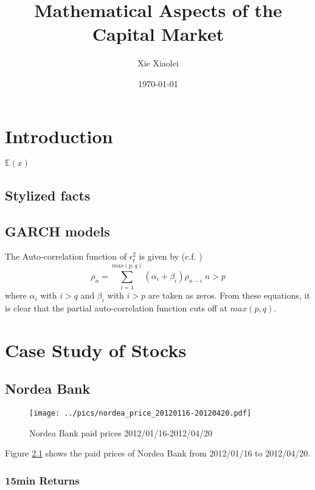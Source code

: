 \documentclass{book}
\title{Mathematical Aspects of the Capital Market}
\author{Xie Xiaolei}
\date{\today}
\begin{document}
\maketitle
\tableofcontents

\chapter{Introduction}
$\mathbb{E}(x)$

\section{Stylized facts}

\section{GARCH models}
The Auto-correlation function of $\epsilon_t^2$ is given by
(c.f. \cite{Bollerslev87})
$$
\rho_n = \sum_{i=1}^{max(p,q)} (\alpha_i + \beta_i) \rho_{n-i}
\;n > p
$$
where $\alpha_i$ with $i > q$ and $\beta_i$ with $i > p$ are taken as
zeros. From these equations, it is clear that the partial
auto-correlation function cuts off at $max(p, q)$.


\chapter{Case Study of Stocks}
\section{Nordea Bank}
\begin{figure}[ht]
  \centering
  \texttt{[image: ../pics/nordea\_price\_20120116-20120420.pdf]}
  \caption{Nordea Bank paid prices 2012/01/16-2012/04/20}
  \label{fig:Nordea}
\end{figure}
Figure \ref{fig:Nordea} shows the paid prices of Nordea Bank from
2012/01/16 to 2012/04/20.

\subsection{15min Returns}
\end{document}
